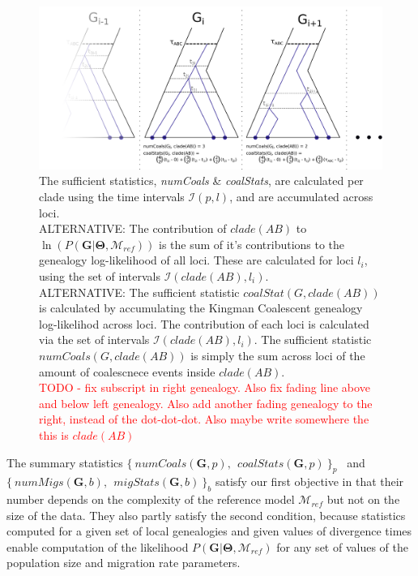 \documentclass[11pt]{article}
\newcommand{\vect}[1]{\boldsymbol{\mathbf{#1}}}
\newcommand{\M}{\mathcal{M}}
\newcommand{\G}{\vect{G}}
\newcommand{\T}{\vect{\Theta}}
\newcommand{\Ip}{\mathcal{I}(p,l)}
\newcommand{\Mref}{\M_{ref}}
\newcommand{\1}{\mathbbm{1}}
\begin{document}
\begin{figure}[h]
\centering
\includegraphics[width=1.0\textwidth]
{multiple_loci}
\captionsetup{width=.8\textwidth}
\caption{The sufficient statistics, \textit{numCoals} \& \textit{coalStats}, are calculated per clade using the time intervals $\Ip$, and are accumulated across loci.\\
%
ALTERNATIVE: The contribution of $clade(AB)$ to $\ln \left( P(\G| \T,\Mref) \right)$ is the sum of it's contributions to the genealogy log-likelihood of all loci. These are calculated for loci $l_i$, using the set of intervals $\mathcal{I}(clade(AB),l_i)$.\\
%
ALTERNATIVE: The sufficient statistic $coalStat(G, clade(AB))$ is calculated by accumulating the Kingman Coalescent genealogy log-likelihod across loci. The contribution of each loci is calculated via the set of intervals $\mathcal{I}(clade(AB),l_i)$. The sufficient statistic $numCoals(G, clade(AB))$ is simply the sum across loci of the amount of coalescnece events inside $clade(AB)$.\\
%
\textcolor{red}{TODO - fix subscript in right genealogy. Also fix fading line above and below left genealogy. Also add another fading genealogy to the right, instead of the dot-dot-dot. Also maybe write somewhere the this is $clade(AB)$}}
\label{fig:multiple_loci}
\end{figure}


The summary statistics $\{~numCoals(\G,p),~~ coalStats(\G,p)~\}_p$~ and ~$\{~numMigs(\G,b),~~ migStats(\G,b)~\}_b$ satisfy our first objective in that their number depends on the complexity of the reference model $\Mref$ but not on the size of the data.
%
They also partly satisfy the second condition, because statistics computed for a given set of local genealogies and given values of divergence times enable computation of the likelihood $P(\G|\T,\Mref)$ for any set of values of the population size and migration rate parameters.
%
\end{document}
